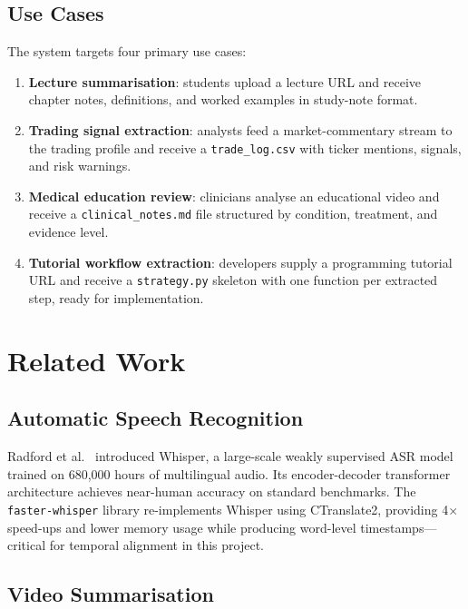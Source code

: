 \documentclass[12pt,a4paper]{article}
\begin{document}
\subsection{Use Cases}

The system targets four primary use cases:
\begin{enumerate}[leftmargin=*]
  \item \textbf{Lecture summarisation}: students upload a lecture URL and receive chapter
    notes, definitions, and worked examples in study-note format.
  \item \textbf{Trading signal extraction}: analysts feed a market-commentary stream to
    the trading profile and receive a \texttt{trade\_log.csv} with ticker mentions,
    signals, and risk warnings.
  \item \textbf{Medical education review}: clinicians analyse an educational video and
    receive a \texttt{clinical\_notes.md} file structured by condition, treatment, and
    evidence level.
  \item \textbf{Tutorial workflow extraction}: developers supply a programming tutorial
    URL and receive a \texttt{strategy.py} skeleton with one function per extracted
    step, ready for implementation.
\end{enumerate}

\section{Related Work}
\label{sec:related}

\subsection{Automatic Speech Recognition}

Radford et al.\ \cite{whisper2022} introduced Whisper, a large-scale weakly supervised
ASR model trained on 680,000 hours of multilingual audio. Its encoder-decoder
transformer architecture achieves near-human accuracy on standard benchmarks. The
\texttt{faster-whisper} library \cite{fasterwhisper} re-implements Whisper using
CTranslate2, providing 4$\times$ speed-ups and lower memory usage while producing
word-level timestamps—critical for temporal alignment in this project.

\subsection{Video Summarisation}
\end{document}
